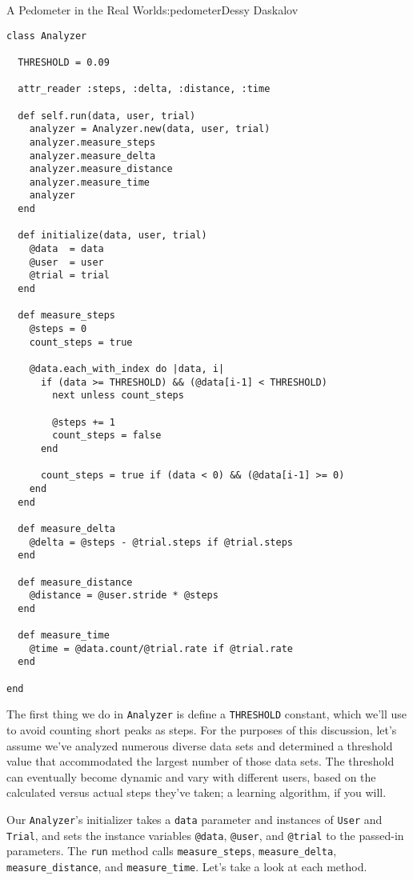 \begin{aosachapter}{A Pedometer in the Real World}{s:pedometer}{Dessy Daskalov}
\begin{verbatim}
class Analyzer

  THRESHOLD = 0.09

  attr_reader :steps, :delta, :distance, :time

  def self.run(data, user, trial)
    analyzer = Analyzer.new(data, user, trial)
    analyzer.measure_steps
    analyzer.measure_delta
    analyzer.measure_distance
    analyzer.measure_time
    analyzer
  end

  def initialize(data, user, trial)
    @data  = data
    @user  = user
    @trial = trial
  end

  def measure_steps
    @steps = 0
    count_steps = true

    @data.each_with_index do |data, i|
      if (data >= THRESHOLD) && (@data[i-1] < THRESHOLD)
        next unless count_steps

        @steps += 1
        count_steps = false
      end

      count_steps = true if (data < 0) && (@data[i-1] >= 0)
    end
  end

  def measure_delta
    @delta = @steps - @trial.steps if @trial.steps
  end

  def measure_distance
    @distance = @user.stride * @steps
  end

  def measure_time
    @time = @data.count/@trial.rate if @trial.rate
  end

end
\end{verbatim}

The first thing we do in \texttt{Analyzer} is define a
\texttt{THRESHOLD} constant, which we'll use to avoid counting short
peaks as steps. For the purposes of this discussion, let's assume we've
analyzed numerous diverse data sets and determined a threshold value
that accommodated the largest number of those data sets. The threshold
can eventually become dynamic and vary with different users, based on
the calculated versus actual steps they've taken; a learning algorithm,
if you will.

Our \texttt{Analyzer}'s initializer takes a \texttt{data} parameter and
instances of \texttt{User} and \texttt{Trial}, and sets the instance
variables \texttt{@data}, \texttt{@user}, and \texttt{@trial} to the
passed-in parameters. The \texttt{run} method calls
\texttt{measure\_steps}, \texttt{measure\_delta},
\texttt{measure\_distance}, and \texttt{measure\_time}. Let's take a
look at each method.

\label{measureux5fsteps}


\end{aosachapter}
